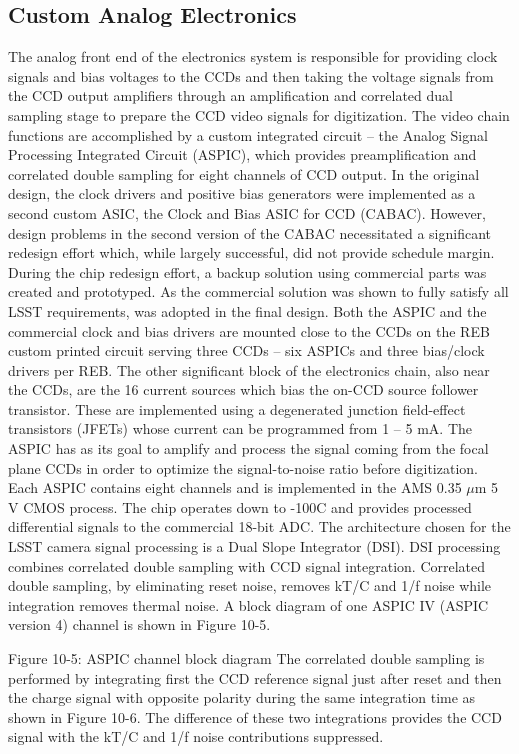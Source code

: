 \subsection{Custom Analog Electronics}
The analog front end of the electronics system is responsible for providing clock signals and bias voltages to the CCDs and then taking the voltage signals from the CCD output amplifiers through an amplification and correlated dual sampling stage to prepare the CCD video signals for digitization. The video chain functions are accomplished by a custom integrated circuit – the Analog Signal Processing Integrated Circuit (ASPIC), which provides preamplification and correlated double sampling for eight channels of CCD output.
In the original design, the clock drivers and positive bias generators were implemented as a second custom ASIC, the Clock and Bias ASIC for CCD (CABAC). However, design problems in the second version of the CABAC necessitated a significant redesign effort which, while largely successful, did not provide schedule margin. During the chip redesign effort, a backup solution using commercial parts was created and prototyped. As the commercial solution was shown to fully satisfy all LSST requirements, was adopted in the final design. 
Both the ASPIC and the commercial clock and bias drivers are mounted close to the CCDs on the REB custom printed circuit serving three CCDs – six ASPICs and three bias/clock drivers per REB. The other significant block of the electronics chain, also near the CCDs,  are the 16 current sources which bias the on-CCD source follower transistor. These are implemented using a degenerated junction field-effect transistors (JFETs) whose current can be programmed from 1 – 5 mA. The ASPIC has as its goal to amplify and process the signal coming from the focal plane CCDs in order to optimize the signal-to-noise ratio before digitization. 
Each ASPIC contains eight channels and is implemented in the AMS 0.35 $\mu$m 5 V CMOS process. The chip operates down to -100C and provides processed differential signals to the commercial 18-bit ADC.
The architecture chosen for the LSST camera signal processing is a Dual Slope Integrator (DSI). DSI processing combines correlated double sampling with CCD signal integration. Correlated double sampling, by eliminating reset noise, removes kT/C and 1/f noise while integration removes thermal noise. A block diagram of one ASPIC IV (ASPIC version 4) channel is shown in Figure 10-5. 
 
Figure 10-5: ASPIC channel block diagram
The correlated double sampling is performed by integrating first the CCD reference signal just after reset and then the charge signal with opposite polarity during the same integration time as shown in Figure 10-6. The difference of these two integrations provides the CCD signal with the kT/C and 1/f noise contributions suppressed.
 
